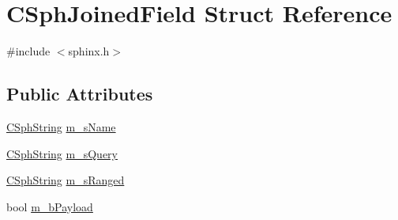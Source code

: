 \hypertarget{structCSphJoinedField}{\section{C\-Sph\-Joined\-Field Struct Reference}
\label{structCSphJoinedField}
}


{\ttfamily \#include $<$sphinx.\-h$>$}

\subsection*{Public Attributes}
\begin{DoxyCompactItemize}
\item 
\hyperlink{structCSphString}{C\-Sph\-String} \hyperlink{structCSphJoinedField_a352ea93b82bb7c59d80a32ab6fa18d17}{m\-\_\-s\-Name}
\item 
\hyperlink{structCSphString}{C\-Sph\-String} \hyperlink{structCSphJoinedField_a10e549a997c741a2274195882a524b00}{m\-\_\-s\-Query}
\item 
\hyperlink{structCSphString}{C\-Sph\-String} \hyperlink{structCSphJoinedField_a58dda308b3e008673fc2f32936dec1d7}{m\-\_\-s\-Ranged}
\item 
bool \hyperlink{structCSphJoinedField_a8381223d3fd61c2b9f782890bce7e024}{m\-\_\-b\-Payload}
\end{DoxyCompactItemize}


